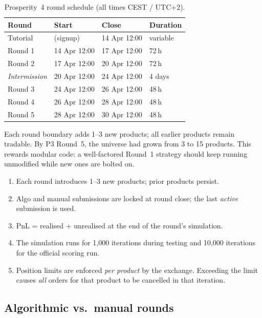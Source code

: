 \begin{table}[htbp]
\centering
\small
\caption{Prosperity~4 round schedule (all times CEST / UTC+2).}
\label{tab:round_schedule}
\begin{tabular}{@{}llll@{}}
\toprule
\textbf{Round} & \textbf{Start} & \textbf{Close} &
\textbf{Duration} \\
\midrule
Tutorial & (signup) & 14 Apr 12:00 & variable \\
Round 1 & 14 Apr 12:00 & 17 Apr 12:00 & 72\,h \\
Round 2 & 17 Apr 12:00 & 20 Apr 12:00 & 72\,h \\
\emph{Intermission} & 20 Apr 12:00 & 24 Apr 12:00 & 4 days \\
Round 3 & 24 Apr 12:00 & 26 Apr 12:00 & 48\,h \\
Round 4 & 26 Apr 12:00 & 28 Apr 12:00 & 48\,h \\
Round 5 & 28 Apr 12:00 & 30 Apr 12:00 & 48\,h \\
\bottomrule
\end{tabular}
\end{table}

Each round boundary adds 1--3 new products; all earlier products remain
tradable.  By P3 Round~5, the universe had grown from 3 to 15 products.
This rewards modular code: a well-factored Round~1 strategy should keep
running unmodified while new ones are bolted on.

\begin{keyfactbox}
\begin{enumerate}
  \item Each round introduces 1--3 new products; prior products persist.
  \item Algo and manual submissions are locked at round close; the
  last \emph{active} submission is used.
  \item PnL = realised + unrealised at the end of the round's
  simulation.
  \item The simulation runs for 1{,}000 iterations during testing
  and 10{,}000 iterations for the official scoring run.
  \item Position limits are enforced \emph{per product} by the
  exchange.  Exceeding the limit causes \emph{all} orders for that
  product to be cancelled in that iteration.
\end{enumerate}
\end{keyfactbox}

\subsection{Algorithmic vs.\ manual rounds}

